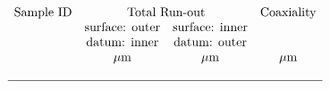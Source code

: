 \documentclass[CIPM]{MSLCalCert}
\begin{document}
 \begin{center} %
 
 \begin{singlespace}
 
 	\small	%
 
  	\setlength{\extrarowheight}{3pt}
  
	\[
  		\begin{array}{SSSS}
\multicolumn{1}{c}{\text{Sample ID} } & \multicolumn{2}{c}{\text{Total Run-out} } & \multicolumn{1}{c}{\text{Coaxiality} }  \\
\multicolumn{1}{c}{}          & \multicolumn{1}{c}{\text{surface: outer}} & \multicolumn{1}{c}{\text{surface: inner}} & \multicolumn{1}{c}{}            \\
\multicolumn{1}{c}{}          & \multicolumn{1}{c}{\text{datum: inner}}   & \multicolumn{1}{c}{\text{datum: outer}}   & \multicolumn{1}{c}{}            \\
\multicolumn{1}{c}{}          & \multicolumn{1}{c}{\si{\mu m}}             & \multicolumn{1}{c}{\si{\mu m}}             & \multicolumn{1}{c}{\si{\mu m} }         \\
     		\\ \hline %


\end{array}\]
\end{singlespace}
\end{center}
\end{document}
